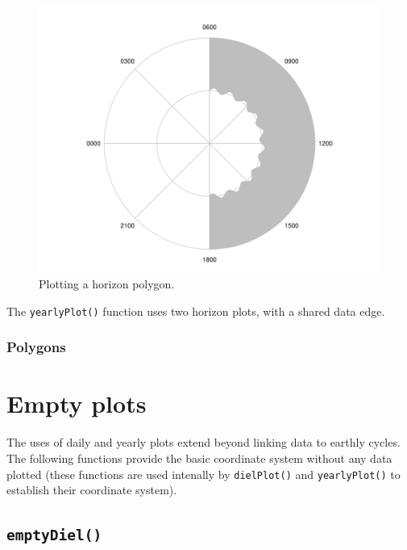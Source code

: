 \documentclass[
]{book}
\begin{document}
\begin{figure}

{\centering \includegraphics[width=0.9\linewidth]{_main_files/figure-latex/radialPolygon-horizon2-1} 

}

\caption{Plotting a horizon polygon.}\label{fig:radialPolygon-horizon2}
\end{figure}

The \texttt{yearlyPlot()} function uses two horizon plots, with a shared data edge.

\hypertarget{polygons}{%
\subsubsection{Polygons}\label{polygons}}

\hypertarget{empty-plots}{%
\section{Empty plots}\label{empty-plots}}

The uses of daily and yearly plots extend beyond linking data to earthly cycles. The following functions provide the basic coordinate system without any data plotted (these functions are used intenally by \texttt{dielPlot()} and \texttt{yearlyPlot()} to establish their coordinate system).

\hypertarget{emptydiel}{%
\subsection{\texorpdfstring{\texttt{emptyDiel()}}{emptyDiel()}}\label{emptydiel}}
\end{document}
